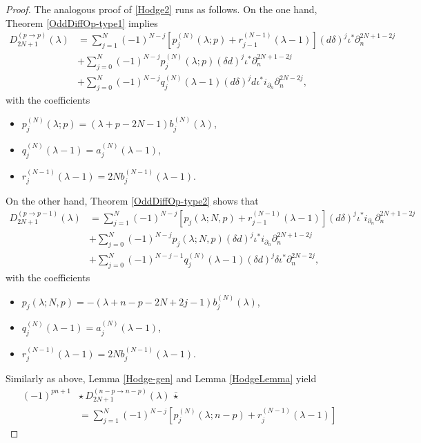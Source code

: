 \documentclass[a4paper,12pt,reqno]{amsart}
\numberwithin{theorem}{subsection}
\numberwithin{equation}{section}
\begin{document}
\begin{proof}
The analogous proof of \eqref{Hodge2} runs as follows. On the one hand, Theorem
\ref{OddDiffOp-type1} implies
\begin{align*}
   D^{(p\to p)}_{2N+1}(\lambda) & = \sum_{j=1}^N(-1)^{N-j}
   \left[p_j^{(N)}(\lambda;p) + r_{j-1}^{(N-1)}(\lambda\!-\!1)\right]
   ({d}\delta)^j \iota^* \partial_n^{2N+1-2j} \\
   & + \sum_{j=0}^N(-1)^{N-j} p_j^{(N)}(\lambda;p)(\delta{d})^j \iota^* \partial_n^{2N+1-2j} \\
   & +\sum_{j=0}^N(-1)^{N-j} q_j^{(N)}(\lambda\!-\!1) ({d}\delta)^j {d} \iota^* i_{\partial_n} \partial_n^{2N-2j},
\end{align*}
with the coefficients
\begin{itemize}
   \item $p_j^{(N)}(\lambda;p) = (\lambda\!+\!p\!-\!2N\!-\!1) b_j^{(N)}(\lambda)$,
   \item $q_j^{(N)}(\lambda\!-\!1) = a_j^{(N)}(\lambda\!-\!1)$,
   \item $r_j^{(N-1)}(\lambda\!-\!1) = 2N b_j^{(N-1)}(\lambda\!-\!1)$.
\end{itemize}
On the other hand, Theorem \ref{OddDiffOp-type2} shows that
\begin{align*}
   D^{(p\to p-1)}_{2N+1}(\lambda) & = \sum_{j=1}^N(-1)^{N-j}
   \left[p_j(\lambda;N,p) + r_{j-1}^{(N-1)}(\lambda\!-\!1)\right] ({d}\delta)^j \iota^* i_{\partial_n}
   \partial_n^{2N+1-2j} \\
   & + \sum_{j=0}^N(-1)^{N-j} p_j(\lambda;N,p) (\delta{d})^j \iota^*i_{\partial_n}\partial_n^{2N+1-2j} \\
   & + \sum_{j=0}^{N}(-1)^{N-j-1} q_j^{(N)}(\lambda\!-\!1) (\delta{d})^j \delta \iota^*\partial_n^{2N-2j},
\end{align*}
with the coefficients
\begin{itemize}
   \item $p_j(\lambda;N,p) = -(\lambda\!+\!n\!-\!p\!-\!2N\!+\!2j\!-\!1) b_j^{(N)}(\lambda)$,
   \item $q_j^{(N)}(\lambda\!-\!1) = a_j^{(N)}(\lambda\!-\!1)$,
   \item $r_j^{(N-1)}(\lambda\!-\!1) = 2N b_j^{(N-1)}(\lambda\!-\!1)$.
\end{itemize}
Similarly as above, Lemma \ref{Hodge-gen} and Lemma \ref{HodgeLemma} yield
\begin{align*}
   (-1)^{pn+1} & \star \, D^{(n-p\to n-p)}_{2N+1}(\lambda) \, \bar{\star} \\
   & = \sum_{j=1}^N(-1)^{N-j} \left[p_j^{(N)}(\lambda;n\!-\!p) + r_j^{(N-1)}(\lambda\!-\!1)\right]

\end{align*}
\end{proof}
\end{document}

